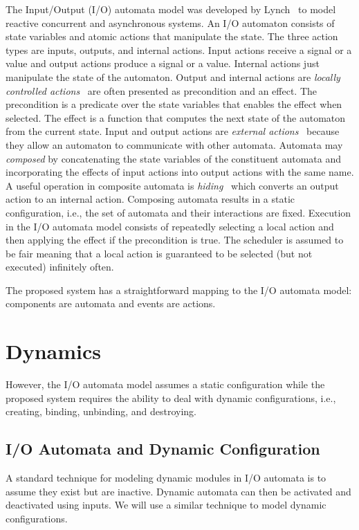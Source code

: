 The Input/Output (I/O) automata model was developed by Lynch~\cite{lynch1996distributed} to model reactive concurrent and asynchronous systems.
An I/O automaton consists of state variables and atomic actions that manipulate the state.
The three action types are inputs, outputs, and internal actions.
Input actions receive a signal or a value and output actions produce a signal or a value.
Internal actions just manipulate the state of the automaton.
Output and internal actions are \emph{locally controlled actions}~\cite{lynch1996distributed} are often presented as precondition and an effect.
The precondition is a predicate over the state variables that enables the effect when selected.
The effect is a function that computes the next state of the automaton from the current state.
Input and output actions are \emph{external actions}~\cite{lynch1996distributed} because they allow an automaton to communicate with other automata.
Automata may \emph{composed} by concatenating the state variables of the constituent automata and incorporating the effects of input actions into output actions with the same name.
A useful operation in composite automata is \emph{hiding}~\cite{lynch1996distributed} which converts an output action to an internal action.
Composing automata results in a static configuration, i.e., the set of automata and their interactions are fixed.
Execution in the I/O automata model consists of repeatedly selecting a local action and then applying the effect if the precondition is true.
The scheduler is assumed to be fair meaning that a local action is guaranteed to be selected (but not executed) infinitely often.

The proposed system has a straightforward mapping to the I/O automata model: components are automata and events are actions.

\section{Dynamics}

However, the I/O automata model assumes a static configuration while the proposed system requires the ability to deal with dynamic configurations, i.e., creating, binding, unbinding, and destroying.

\subsection{I/O Automata and Dynamic Configuration}

A standard technique for modeling dynamic modules in I/O automata is to assume they exist but are inactive.
Dynamic automata can then be activated and deactivated using inputs.
We will use a similar technique to model dynamic configurations.

